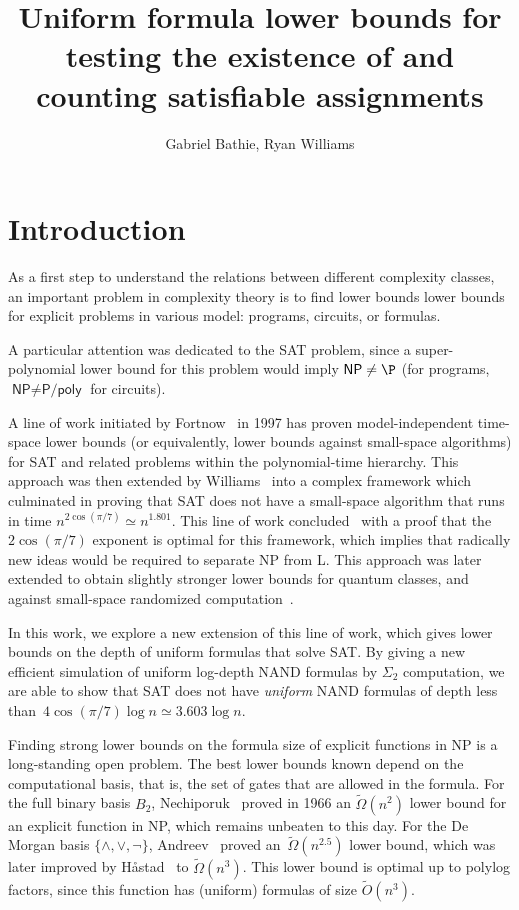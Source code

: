 \documentclass[a4paper, 11pt]{article}
\title{Uniform formula lower bounds for testing the existence of and counting satisfiable assignments}
\author{Gabriel Bathie, Ryan Williams}
\theoremstyle{plain}
\theoremstyle{definition}
\theoremstyle{remark}
\newcommand{\Omegat}[1]{\widetilde{\Omega}\left( #1 \right)}%
\newcommand{\Ot}[1]{\widetilde{O}\left( #1 \right)}%
\newcommand{\Log}{\textsf{L}}%
\newcommand{\NP}{\textsf{NP}}%
\newcommand{\SAT}{\textsf{SAT}}%
\newcommand{\NAND}{\textsf{NAND}}%
\begin{document}
\maketitle

\begin{abstract}
\end{abstract}

\section{Introduction}

As a first step to understand the relations between different complexity classes,
an important problem in complexity theory is to find
lower bounds lower bounds for explicit problems in various model: programs, circuits, or formulas.

A particular attention was dedicated to the \SAT{} problem, 
since a super-polynomial lower bound for this problem would imply $\NP \neq \P$
(for programs, $\NP \neq \textsf{P/poly}$ for circuits).

A line of work initiated by Fortnow~\cite{fortnow2000time,fortnow2005time} in 1997 
has proven model-independent time-space lower bounds
(or equivalently, lower bounds against small-space algorithms) for \SAT{}
and related problems within the polynomial-time hierarchy.
This approach was then extended by Williams~\cite{williams2006inductive,williams2007time,williams2013alternation} 
into a complex framework which culminated in proving that \SAT{} 
does not have a small-space algorithm that runs in time $n^{2\cos(\pi/7)}  \simeq n^{1.801}$.
This line of work concluded~\cite{buss2015limits} with a proof 
that the $2\cos(\pi/7)$ exponent is optimal for this framework,
which implies that radically new ideas would be required to separate \NP{} from \Log{}.
This approach was later extended to obtain slightly stronger lower bounds
for quantum classes, and against small-space randomized computation~\cite{mudigonda2020time}.

In this work, we explore a new extension of this line of work, 
which gives lower bounds on the depth of uniform formulas that solve \SAT{}.
By giving a new efficient simulation of uniform log-depth \NAND{} formulas 
by $\Sigma_2$ computation, we are able to show that \SAT{}
does not have \textit{uniform} \NAND{} formulas 
of depth less than~$4 \cos(\pi/7) \log n \simeq 3.603 \log n$.

Finding strong lower bounds on the formula size of explicit functions in \NP{}
is a long-standing open problem.
The best lower bounds known depend on the computational basis, that is, 
the set of gates that are allowed in the formula.
For the full binary basis $B_2$, Nechiporuk~\cite{nechiporuk66boolean}
proved in 1966 an $\Omegat{n^2}$ lower bound for an explicit function in \NP{}, 
which remains unbeaten to this day.
For the De Morgan basis $\{\wedge, \vee, \neg\}$, Andreev~\cite{andreev1987method} 
proved an~$\Omegat{n^{2.5}}$ lower bound, 
which was later improved by H{\aa}stad~\cite{hastad1998shrinkage} to $\Omegat{n^{3}}$.
This lower bound is optimal up to polylog factors,
since this function has (uniform) formulas of size $\Ot{n^{3}}$.
\end{document}
